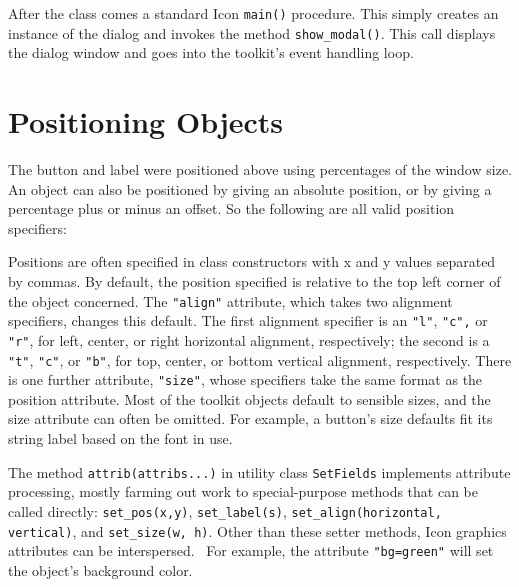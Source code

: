 
After the class comes a standard Icon \texttt{main()} procedure. This
simply creates an instance of the dialog and invokes the method
\texttt{show\_modal()}.
This call displays the dialog window and goes into the
toolkit's event handling loop. 

\section{Positioning Objects}

The button and label were positioned above using
percentages of the window size. An object can also be
positioned by giving an absolute position, or by giving a percentage
plus or minus an offset. So the following are all valid position
specifiers:


Positions are often specified in class constructors
with x and y values separated by commas. By default, the
position specified is relative to the top left corner of the object
concerned. The \texttt{"align"}
attribute, which takes two alignment specifiers, changes this
default. The first alignment specifier is an
\texttt{"l"},
\texttt{"c"}\texttt{,} or
\texttt{"r"}, for left, center, or right
horizontal alignment, respectively; the second is a
\texttt{"t"},
\texttt{"c"}, or
\texttt{"b"}, for top, center, or bottom
vertical alignment, respectively. There is one further attribute,
\texttt{"size"}, whose specifiers take the
same format as the position attribute. Most of the toolkit objects
default to sensible sizes, and the size attribute can often be omitted.
For example, a button's size defaults fit its string label
based on the font in use.

The method \texttt{attrib(attribs...)} in utility class
\texttt{SetFields} implements attribute
processing, mostly farming out work to special-purpose methods
that can be called directly: \texttt{set\_pos(x,y)},
\texttt{set\_label(s)}, \texttt{set\_align(horizontal, vertical)}, and
\texttt{set\_size(w, }\texttt{h)}. Other than these setter methods,
Icon graphics attributes can be interspersed. \ For example, the
attribute \texttt{"bg=green"} will set the
object's background color.

